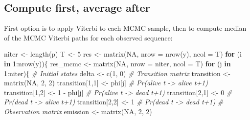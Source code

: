 \documentclass[
  12pt,
]{krantz}
\newenvironment{Shaded}{\begin{snugshade}}{\end{snugshade}}
\newcommand{\AttributeTok}[1]{\textcolor[rgb]{0.77,0.63,0.00}{#1}}
\newcommand{\CommentTok}[1]{\textcolor[rgb]{0.56,0.35,0.01}{\textit{#1}}}
\newcommand{\ConstantTok}[1]{\textcolor[rgb]{0.00,0.00,0.00}{#1}}
\newcommand{\ControlFlowTok}[1]{\textcolor[rgb]{0.13,0.29,0.53}{\textbf{#1}}}
\newcommand{\DecValTok}[1]{\textcolor[rgb]{0.00,0.00,0.81}{#1}}
\newcommand{\FunctionTok}[1]{\textcolor[rgb]{0.00,0.00,0.00}{#1}}
\newcommand{\NormalTok}[1]{#1}
\newcommand{\OtherTok}[1]{\textcolor[rgb]{0.56,0.35,0.01}{#1}}
\newcommand{\SpecialCharTok}[1]{\textcolor[rgb]{0.00,0.00,0.00}{#1}}
\begin{document}
\hypertarget{compute-average}{%
\subsection{Compute first, average after}\label{compute-average}}

First option is to apply Viterbi to each MCMC sample, then to compute median of the MCMC Viterbi paths for each observed sequence:

\begin{Shaded}
\begin{Highlighting}[]
\NormalTok{niter }\OtherTok{\textless{}{-}} \FunctionTok{length}\NormalTok{(p)}
\NormalTok{T }\OtherTok{\textless{}{-}} \DecValTok{5}
\NormalTok{res }\OtherTok{\textless{}{-}} \FunctionTok{matrix}\NormalTok{(}\ConstantTok{NA}\NormalTok{, }\AttributeTok{nrow =} \FunctionTok{nrow}\NormalTok{(y), }\AttributeTok{ncol =}\NormalTok{ T)}
\ControlFlowTok{for}\NormalTok{ (i }\ControlFlowTok{in} \DecValTok{1}\SpecialCharTok{:}\FunctionTok{nrow}\NormalTok{(y))\{}
\NormalTok{  res\_mcmc }\OtherTok{\textless{}{-}} \FunctionTok{matrix}\NormalTok{(}\ConstantTok{NA}\NormalTok{, }\AttributeTok{nrow =}\NormalTok{ niter, }\AttributeTok{ncol =}\NormalTok{ T)}
  \ControlFlowTok{for}\NormalTok{ (j }\ControlFlowTok{in} \DecValTok{1}\SpecialCharTok{:}\NormalTok{niter)\{}
    \CommentTok{\# Initial states}
\NormalTok{    delta }\OtherTok{\textless{}{-}} \FunctionTok{c}\NormalTok{(}\DecValTok{1}\NormalTok{, }\DecValTok{0}\NormalTok{)}
    \CommentTok{\# Transition matrix}
\NormalTok{    transition }\OtherTok{\textless{}{-}} \FunctionTok{matrix}\NormalTok{(}\ConstantTok{NA}\NormalTok{, }\DecValTok{2}\NormalTok{, }\DecValTok{2}\NormalTok{)}
\NormalTok{    transition[}\DecValTok{1}\NormalTok{,}\DecValTok{1}\NormalTok{] }\OtherTok{\textless{}{-}}\NormalTok{ phi[j]      }\CommentTok{\# Pr(alive t {-}\textgreater{} alive t+1)}
\NormalTok{    transition[}\DecValTok{1}\NormalTok{,}\DecValTok{2}\NormalTok{] }\OtherTok{\textless{}{-}} \DecValTok{1} \SpecialCharTok{{-}}\NormalTok{ phi[j]  }\CommentTok{\# Pr(alive t {-}\textgreater{} dead t+1)}
\NormalTok{    transition[}\DecValTok{2}\NormalTok{,}\DecValTok{1}\NormalTok{] }\OtherTok{\textless{}{-}} \DecValTok{0}        \CommentTok{\# Pr(dead t {-}\textgreater{} alive t+1)}
\NormalTok{    transition[}\DecValTok{2}\NormalTok{,}\DecValTok{2}\NormalTok{] }\OtherTok{\textless{}{-}} \DecValTok{1}        \CommentTok{\# Pr(dead t {-}\textgreater{} dead t+1)}
    \CommentTok{\# Observation matrix }
\NormalTok{    emission }\OtherTok{\textless{}{-}} \FunctionTok{matrix}\NormalTok{(}\ConstantTok{NA}\NormalTok{, }\DecValTok{2}\NormalTok{, }\DecValTok{2}\NormalTok{)}

\end{Highlighting}
\end{Shaded}
\end{document}
